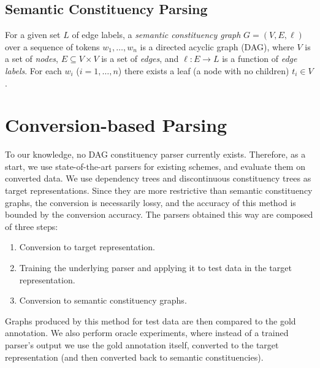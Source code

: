 \documentclass[11pt]{article}
\begin{document}




\subsection{Semantic Constituency Parsing}

For a given set $L$ of edge labels, a \textit{semantic constituency graph} $G=(V,E, \ell)$ over a sequence of tokens $w_1, \ldots, w_n$ is a directed acyclic graph (DAG), where $V$ is a set of \textit{nodes}, $E \subseteq V\times V$ is a set of \textit{edges}, and $\ell:E\to L$ is a function of \textit{edge labels}. For each $w_i$ ($i=1, \ldots, n$) there exists a leaf (a node with no children) $t_i \in V$.


\section{Conversion-based Parsing}\label{sec:conversion_approach}

To our knowledge, no DAG constituency parser currently exists. Therefore, as a start, we use state-of-the-art parsers for existing schemes, and evaluate them on converted data. We use dependency trees and discontinuous constituency trees as target representations. Since they are more restrictive than semantic constituency graphs, the conversion is necessarily lossy, and the accuracy of this method is bounded by the conversion accuracy.
The parsers obtained this way are composed of three steps:
\begin{enumerate}
\item Conversion to target representation.
\item Training the underlying parser and applying it to test data in the target representation.
\item Conversion to semantic constituency graphs.
\end{enumerate}
Graphs produced by this method for test data are then compared to the gold annotation.
We also perform oracle experiments, where instead of a trained parser's output we use the gold annotation itself, converted to the target representation (and then converted back to semantic constituencies).
\end{document}
